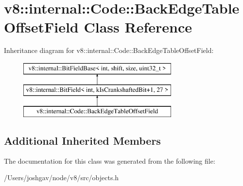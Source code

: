 \hypertarget{classv8_1_1internal_1_1_code_1_1_back_edge_table_offset_field}{}\section{v8\+:\+:internal\+:\+:Code\+:\+:Back\+Edge\+Table\+Offset\+Field Class Reference}
\label{classv8_1_1internal_1_1_code_1_1_back_edge_table_offset_field}
Inheritance diagram for v8\+:\+:internal\+:\+:Code\+:\+:Back\+Edge\+Table\+Offset\+Field\+:\begin{figure}[H]
\begin{center}
\leavevmode
\includegraphics[height=3.000000cm]{classv8_1_1internal_1_1_code_1_1_back_edge_table_offset_field}
\end{center}
\end{figure}
\subsection*{Additional Inherited Members}


The documentation for this class was generated from the following file\+:\begin{DoxyCompactItemize}
\item 
/\+Users/joshgav/node/v8/src/objects.\+h\end{DoxyCompactItemize}
